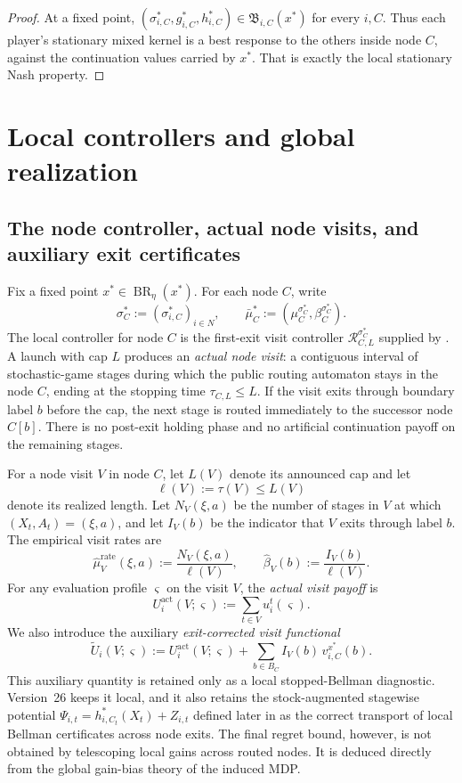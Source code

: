 \documentclass[12pt]{article}
\theoremstyle{definition}
\newcommand{\1}{\mathbf{1}}
\DeclareMathOperator{\BR}{BR}
\begin{document}
\begin{proof}
At a fixed point,
$(\sigma_{i,C}^*,g_{i,C}^*,h_{i,C}^*)\in\mathfrak B_{i,C}(x^*)$ for every $i,C$.
Thus each player's stationary mixed kernel is a best response to the others inside
node $C$, against the continuation values carried by $x^*$. That is exactly the
local stationary Nash property.
\end{proof}


\section{Local controllers and global realization}
\label{sec:realization}

\subsection{The node controller, actual node visits, and auxiliary exit certificates}

Fix a fixed point $x^*\in\BR_\eta(x^*)$. For each node $C$, write
\[
\sigma_C^*:=(\sigma_{i,C}^*)_{i\in N},
\qquad
\bar\mu_C^*:=(\mu_C^{\sigma_C^*},\beta_C^{\sigma_C^*}).
\]
The local controller for node $C$ is the first-exit visit controller
$\mathcal R_{C,L}^{\sigma_C^*}$ supplied by . A
launch with cap $L$ produces an \emph{actual node visit}: a contiguous interval
of stochastic-game stages during which the public routing automaton stays in the
node $C$, ending at the stopping time $\tau_{C,L}\le L$. If the visit exits
through boundary label $b$ before the cap, the next stage is routed immediately
to the successor node $C[b]$. There is no post-exit holding phase and no
artificial continuation payoff on the remaining stages.

For a node visit $V$ in node $C$, let $L(V)$ denote its announced cap and let
\[
\ell(V):=\tau(V)\le L(V)
\]
denote its realized length. Let $N_V(\xi,a)$ be the number of stages in $V$ at
which $(X_t,A_t)=(\xi,a)$, and let $I_V(b)$ be the indicator that $V$ exits
through label $b$. The empirical visit rates are
\[
\widehat\mu_V^{\mathrm{rate}}(\xi,a):=\frac{N_V(\xi,a)}{\ell(V)},
\qquad
\widehat\beta_V(b):=\frac{I_V(b)}{\ell(V)}.
\]
For any evaluation profile $\varsigma$ on the visit $V$, the \emph{actual visit
payoff} is
\begin{equation}
\label{eq:visit-actual-payoff}
U_i^{\mathrm{act}}(V;\varsigma)
:=
\sum_{t\in V} u_i^t(\varsigma).
\end{equation}
We also introduce the auxiliary \emph{exit-corrected visit functional}
\begin{equation}
\label{eq:visit-aux-payoff}
\widetilde U_i(V;\varsigma)
:=
U_i^{\mathrm{act}}(V;\varsigma)
+
\sum_{b\in B_C}I_V(b)\,v_{i,C}^{x^*}(b).
\end{equation}
This auxiliary quantity is retained only as a local stopped-Bellman diagnostic.
Version~26 keeps it local, and it also retains the stock-augmented stagewise
potential $\Psi_{i,t}=h_{i,C_t}^*(X_t)+Z_{i,t}$ defined later in
 as the correct transport of local Bellman certificates
across node exits. The final regret bound, however, is not obtained by
telescoping local gains across routed nodes. It is deduced directly from the
global gain-bias theory of the induced MDP.
\end{document}
